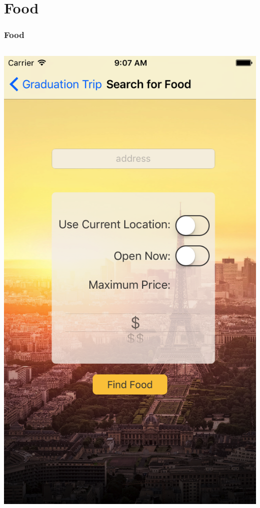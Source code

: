 \documentclass{beamer}
\begin{document}
\section{Food}
\begin{frame}
\frametitle{Food}
\begin{columns}
    \begin{column}{0.3\textwidth}
        \begin{center}
            \includegraphics[scale=0.14]{foodSearch}
        \end{center}

\end{column}
\end{columns}
\end{frame}
\end{document}
